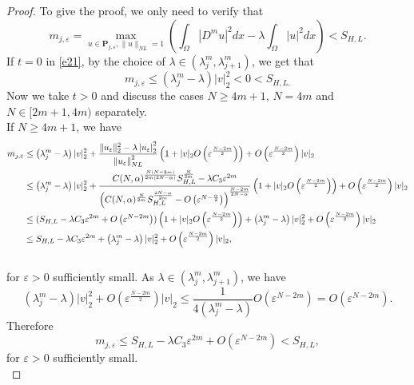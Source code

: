 \documentclass[reqno]{amsart}
\newcommand{\la} {\lambda}
\newcommand{\eps}{\varepsilon}
\newcommand{\Om}{\Omega}
\newcommand{\al} {\alpha}
\numberwithin{theorem}{section} \numberwithin{equation}{section}
\begin{document}
\begin{proof}
To give the proof, we only need to verify that
\[m_{j, \eps}=\max _{u \in \mathbf{P}_{j, \eps}, \|u\|_{NL}=1}\left(\int_{\Om}|D^m u|^2 d x-\la \int_{\Om}|u|^2 d x\right)<S_{H, L}.\]
If $t=0$ in \eqref{e21}, by the choice of $\la \in\left(\la^m_j, \la^m_{j+1}\right)$, we get that
\[m_{j,\eps} \leq\left(\la^m_j-\la\right)|v|_2^2<0<S_{H, L .}\]
Now we take $t>0$ and discuss the cases $N \geq 4m+1$, $N=4m$ and $N\in[2m+1,4m)$   separately.\\
If $N \geq 4m+1$, we have
\begin{align} \notag
m_{j, \eps} & \leq\left(\la^m_j-\la\right)|v|_2^2+\frac{\|u_{\eps}\|_2^2-\la\left|u_{\eps}\right|_2^2}{\left\|u_{\eps}\right\|_{N L}^2}\left(1+|v|_2 O\left(\eps^{\frac{N-2m}{2}}\right)\right)+O\left(\eps^{\frac{N-2m}{2}}\right)|v|_2 \\ \notag
& \leq\left(\la^m_j-\la\right)|v|_2^2+\frac{C(N, \al)^{\frac{N(N-2m)}{2m(2N-\al)}} S_{H, L}^{\frac{N}{2m}}-\la C_3 \eps^{2m}}{\left(C(N, \al)^{\frac{N}{2m}} S_{H, L}^{\frac{2N-\al}{2m}}-O\left(\eps^{N-\frac{\al}{2}}\right)\right)^{\frac{N-2m}{2N-\al}}}\left(1+|v|_2 O\left(\eps^{\frac{N-2m}{2}}\right)\right)+O\left(\eps^{\frac{N-2m}{2}}\right)|v|_2 \\ \notag
&\leq(S_{H, L}-\la C_3 \eps^{2m} + O\left(\eps^{N-2m}\right))\left(1+|v|_2 O\left(\eps^{\frac{N-2m}{2}}\right)\right)+\left(\la^m_j-\la\right)|v|_2^2+O\left(\eps^{\frac{N-2m}{2}}\right)|v|_2 \\  \notag
& \leq S_{H, L}-\la C_3 \eps^{2m}+\left(\la^m_j-\la\right)|v|_2^2+O\left(\eps^{\frac{N-2m}{2}}\right)|v|_2, \\ \notag
\end{align}
for $\eps>0$ sufficiently small. As $\la \in\left(\la^m_j, \la^m_{j+1}\right)$, we have
\begin{equation} \label{e24}
\left(\la^m_j-\la\right)|v|_2^2+O\left(\eps^{\frac{N-2m}{2}}\right)|v|_2 \leq \frac{1}{4\left(\la^m_j-\la\right)} O\left(\eps^{N-2m}\right)=O\left(\eps^{N-2m}\right).
\end{equation}
Therefore
\[m_{j, \eps} \leq S_{H, L}-\la C_3\eps^{2m}+O\left(\eps^{N-2m}\right)<S_{H, L},\]
for $\eps>0$ sufficiently small.\\


\end{proof}
\end{document}
